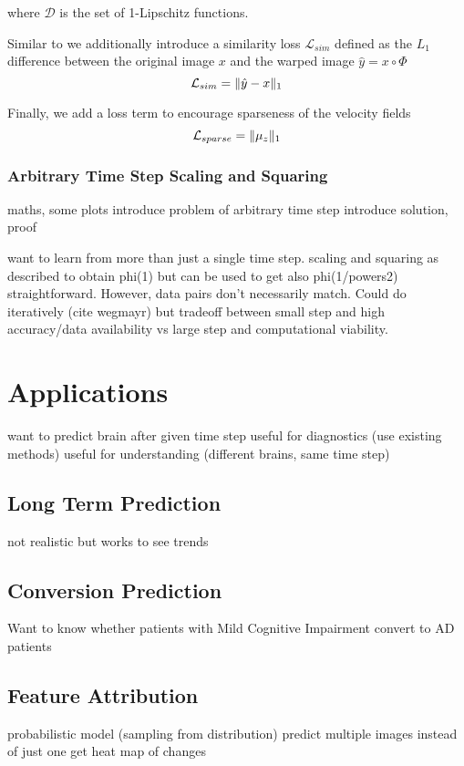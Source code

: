 where $\mathcal{D}$ is the set of 1-Lipschitz functions.


Similar to \cite{VAGAN} we additionally introduce a similarity loss $\mathcal{L}_{sim}$ defined as the $L_1$ difference between the original image $x$ and the warped image $\hat{y} = x \circ \Phi$
\begin{equation}
	\mathcal{L}_{sim} = \lVert\hat{y} - x\rVert_1
\end{equation}

Finally, we add a loss term to encourage sparseness of the velocity fields
\begin{equation}
	\mathcal{L}_{sparse} = \lVert\mu_z\rVert_1
\end{equation}


\subsection{Arbitrary Time Step Scaling and Squaring}
maths, some plots
introduce problem of arbitrary time step
introduce solution, proof

want to learn from more than just a single time step.
scaling and squaring as described to obtain phi(1) but can be used to get also phi(1/powers2) straightforward. However, data pairs don't necessarily match. Could do iteratively (cite wegmayr) but tradeoff between small step and high accuracy/data availability vs large step and computational viability. 

\chapter{Applications}

want to predict brain after given time step
useful for diagnostics (use existing methods)
useful for understanding (different brains, same time step)

\section{Long Term Prediction}
not realistic but works to see trends

\section{Conversion Prediction}
Want to know whether patients with Mild Cognitive Impairment convert to AD patients

\section{Feature Attribution}
probabilistic model (sampling from distribution)
predict multiple images instead of just one
get heat map of changes

